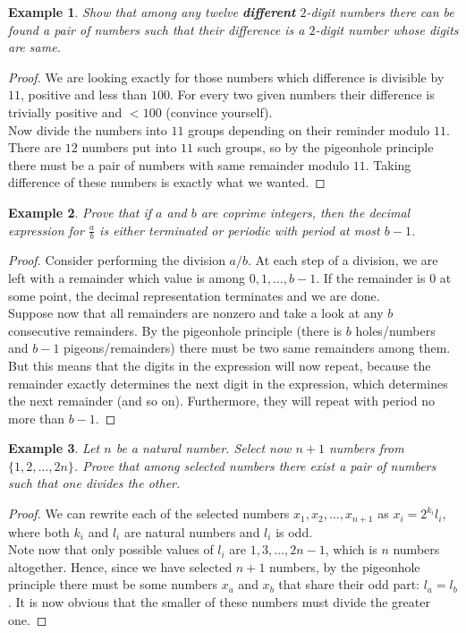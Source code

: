\documentclass[12pt,a4paper]{article}
\newtheorem{theorem}{Example}
\begin{document}
\begin{theorem}
Show that among any twelve \textbf{different} $2$-digit numbers there can be found a pair of numbers such that their difference is a $2$-digit number whose digits are same.
\end{theorem}
\begin{proof}
We are looking exactly for those numbers which difference is divisible by $11$, positive and less than $100$. For every two given numbers their difference is trivially positive and $<100$ (convince yourself).\\
Now divide the numbers into $11$ groups depending on their reminder modulo $11$. There are $12$ numbers put into $11$ such groups, so by the pigeonhole principle there must be a pair of numbers with same remainder modulo $11$. Taking difference of these numbers is exactly what we wanted.
\end{proof}

\begin{theorem}
Prove that if $a$ and $b$ are coprime integers, then the decimal expression for $\frac{a}{b}$ is either terminated or periodic with period at most $b - 1$. 
\end{theorem}
\begin{proof}
Consider performing the division $a/b$. At each step of a division, we are left with a remainder which value is among $0,1,\dots,b-1$. If the remainder is $0$ at some point, the decimal representation terminates and we are done. \\
Suppose now that all remainders are nonzero and take a look at any $b$ consecutive remainders. By the pigeonhole principle (there is $b$ holes/numbers and $b-1$ pigeons/remainders) there must be two same remainders among them. \\
But this means that the digits in the expression will now repeat, because the remainder exactly determines the next digit in the expression, which determines the next remainder (and so on). Furthermore, they will repeat with period no more than $b - 1$.
\end{proof}

\begin{theorem}
Let $n$ be a natural number. Select now $n + 1$ numbers from  $\{1,2,\dots,2n\}$. Prove that among selected numbers there exist a pair of numbers such that one divides the other.
\end{theorem}
\begin{proof}
We can rewrite each of the selected numbers $x_{1}, x_{2}, \dots,x_{n+1}$ as $x_{i} = 2^{k_{i}}l_{i}$, where both $k_{i}$ and $l_{i}$ are natural numbers and  $l_{i}$ is odd. \\
Note now that only possible values of $l_{i}$ are $1,3,\dots,2n - 1$, which is $n$ numbers altogether. Hence, since we have selected $n+1$ numbers, by the pigeonhole principle there must be some numbers $x_{a}$ and $x_{b}$ that share their odd part: $l_{a} = l_{b}$. It is now obvious that the smaller of these numbers must divide the greater one.
\end{proof}
\end{document}
